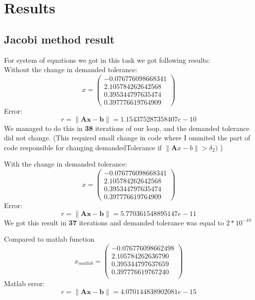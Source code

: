 \section{Results}
\subsection{Jacobi method result}
For system of equations we got in this task we got following results:
\\
Without the change in demanded tolerance:
\[ x = \left( \begin{array}{cc}
  -0.076776098668341 \\
   2.105784262642568 \\
   0.395344797635474 \\
   0.397776619764909
\end{array} \right)
\]
Error:
\[ r = \| \mathbf{A}\mathbf{x} - \mathbf{b}\| = 1.154375287358407e-10 \]
We managed to do this in \textbf{38} iterations of our loop, and the demanded tolerance did not change. (This required small change in code where I ommited the part of code responsible for changing demandedTolerance if $ \| \mathbf{A}x-b \| > \delta_2) $ )

With the change in demanded tolerance:
\[ x = \left( \begin{array}{cc}
  -0.076776098668341 \\
   2.105784262642568 \\
   0.395344797635474 \\
   0.397776619764909
\end{array} \right)
\]
Error:
\[ r = \| \mathbf{A}\mathbf{x} - \mathbf{b}\| = 5.770361548895147e-11 \]
We got this result in \textbf{37} iterations and demanded tolerance was equal to $2*10^{-10}$

Compared to matlab function
\[ x_{matlab} = \left( \begin{array}{cc}
  -0.076776098662498 \\
   2.105784262636790 \\
   0.395344797637659 \\
   0.397776619767240 \\
\end{array} \right)
\]
Matlab error:
\[ r = \| \mathbf{A}\mathbf{x} - \mathbf{b}\| = 4.070144838902081e-15 \]

